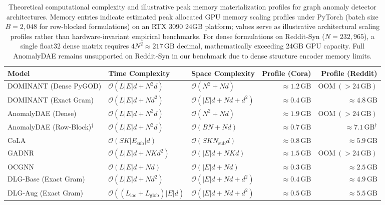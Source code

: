 \documentclass[11pt,a4paper]{article}
\begin{document}
\begin{table}[htbp]
\centering\footnotesize\setlength{\tabcolsep}{3pt}
\caption{Theoretical computational complexity and illustrative peak memory materialization profiles for graph anomaly detector architectures. Memory entries indicate estimated peak allocated GPU memory scaling profiles under PyTorch (batch size $B=2{,}048$ for row-blocked formulations) on an RTX 3090 24GB platform; values serve as illustrative architectural scaling profiles rather than hardware-invariant empirical benchmarks. For dense formulations on Reddit-Syn ($N=232,965$), a single float32 dense matrix requires $4 N^2 \approx 217\,\mathrm{GB}$ decimal, mathematically exceeding 24GB GPU capacity. Full AnomalyDAE remains unsupported on Reddit-Syn in our benchmark due to dense structure encoder memory limits.}
\label{tab:complexity_comparison}
\begin{tabularx}{\textwidth}{lXXrr}\toprule
\textbf{Model} & \textbf{Time Complexity} & \textbf{Space Complexity} & \textbf{Profile (Cora)} & \textbf{Profile (Reddit)} \\\midrule
DOMINANT (Dense PyGOD) & $\mathcal{O}(L |E| d + N^2 d)$ & $\mathcal{O}(N^2 + N d)$ & $\approx 1.2\,\mathrm{GB}$ & $\mathrm{OOM}\ (>24\,\mathrm{GB})$ \\
DOMINANT (Exact Gram) & $\mathcal{O}(L |E| d + N d^2)$ & $\mathcal{O}(|E| d + N d + d^2)$ & $\approx 0.4\,\mathrm{GB}$ & $\approx 4.8\,\mathrm{GB}$ \\
AnomalyDAE (Dense) & $\mathcal{O}(L |E| d + N^2 d)$ & $\mathcal{O}(N^2 + N d)$ & $\approx 1.9\,\mathrm{GB}$ & $\mathrm{OOM}\ (>24\,\mathrm{GB})$ \\
AnomalyDAE (Row-Block)$^\dagger$ & $\mathcal{O}(L |E| d + N^2 d)$ & $\mathcal{O}(B N + N d)$ & $\approx 0.7\,\mathrm{GB}$ & $\approx 7.1\,\mathrm{GB}^\dagger$ \\
CoLA & $\mathcal{O}(S K |E_{\mathrm{sub}}| d)$ & $\mathcal{O}(S K N_{\mathrm{sub}} d)$ & $\approx 0.8\,\mathrm{GB}$ & $\approx 5.9\,\mathrm{GB}$ \\
GADNR & $\mathcal{O}(L |E| d + N K d^2)$ & $\mathcal{O}(|E| d + N K d)$ & $\approx 1.5\,\mathrm{GB}$ & $\mathrm{OOM}\ (>24\,\mathrm{GB})$ \\
OCGNN & $\mathcal{O}(L |E| d + N d)$ & $\mathcal{O}(|E| d + N d)$ & $\approx 0.3\,\mathrm{GB}$ & $\approx 2.5\,\mathrm{GB}$ \\
DLG-Base (Exact Gram) & $\mathcal{O}(L |E| d + N d^2)$ & $\mathcal{O}(|E| d + N d + d^2)$ & $\approx 0.4\,\mathrm{GB}$ & $\approx 4.9\,\mathrm{GB}$ \\
DLG-Aug (Exact Gram) & $\mathcal{O}((L_{\mathrm{loc}} + L_{\mathrm{glob}}) |E| d)$ & $\mathcal{O}(|E| d + N d + d^2)$ & $\approx 0.5\,\mathrm{GB}$ & $\approx 5.5\,\mathrm{GB}$ \\\bottomrule
\end{tabularx}
\end{table}
\end{document}
